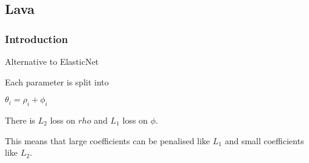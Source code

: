 
\subsection{Lava}

\subsubsection{Introduction}

Alternative to ElasticNet

Each parameter is split into

\(\theta_i=\rho_i+\phi_i\)

There is \(L_2\) loss on \(rho\) and \(L_1\) loss on \(\phi \).

This means that large coefficients can be penalised like \(L_1\) and small coefficients like \(L_2\).

